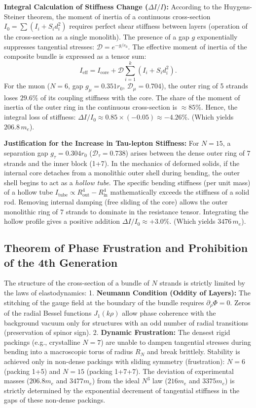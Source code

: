 \documentclass[11pt,a4paper]{article}
\begin{document}
\textbf{Integral Calculation of Stiffness Change ($\Delta I/I$):}
According to the Huygens-Steiner theorem, the moment of inertia of a continuous cross-section $I_0 = \sum (I_i + S_i d_i^2)$ requires perfect shear stiffness between layers (operation of the cross-section as a single monolith). The presence of a gap $g$ exponentially suppresses tangential stresses: $\mathcal{D} = e^{-g/r_0}$. The effective moment of inertia of the composite bundle is expressed as a tensor sum:
\begin{equation}
I_{\text{eff}} = I_{\text{core}} + \mathcal{D} \sum_{i=1}^{k} \left( I_i + S_i d_i^2 \right).
\end{equation}
For the muon ($N=6$, gap $g_\mu = 0.351 r_0$, $\mathcal{D}_\mu = 0.704$), the outer ring of 5 strands loses $29.6\%$ of its coupling stiffness with the core. The share of the moment of inertia of the outer ring in the continuous cross-section is $\approx 85\%$. Hence, the integral loss of stiffness: $\Delta I / I_0 \approx 0.85 \times (-0.05) \approx -4.26\%$. (Which yields $206.8 \, m_e$).

\textbf{Justification for the Increase in Tau-lepton Stiffness:}
For $N=15$, a separation gap $g_\tau = 0.304 r_0$ ($\mathcal{D}_\tau = 0.738$) arises between the dense outer ring of 7 strands and the inner block (1+7). In the mechanics of deformed solids, if the internal core detaches from a monolithic outer shell during bending, the outer shell begins to act as a \textit{hollow tube}. The specific bending stiffness (per unit mass) of a hollow tube $I_{\text{tube}} \propto R_{\text{out}}^4 - R_{\text{in}}^4$ mathematically exceeds the stiffness of a solid rod. Removing internal damping (free sliding of the core) allows the outer monolithic ring of 7 strands to dominate in the resistance tensor. Integrating the hollow profile gives a positive addition $\Delta I / I_0 \approx +3.0\%$. (Which yields $3476 \, m_e$).

\subsection{Theorem of Phase Frustration and Prohibition of the 4th Generation}
The structure of the cross-section of a bundle of $N$ strands is strictly limited by the laws of elastodynamics:
1. \textbf{Neumann Condition (Oddity of Layers):} The stitching of the gauge field at the boundary of the bundle requires $\partial_\rho \Phi = 0$. Zeros of the radial Bessel functions $J_1(k\rho)$ allow phase coherence with the background vacuum only for structures with an odd number of radial transitions (preservation of spinor sign).
2. \textbf{Dynamic Frustration:} The densest rigid packings (e.g., crystalline $N=7$) are unable to dampen tangential stresses during bending into a macroscopic torus of radius $R_N$ and break brittlely. Stability is achieved only in non-dense packings with sliding symmetry (frustration): $N=6$ (packing 1+5) and $N=15$ (packing 1+7+7).
The deviation of experimental masses ($206.8 m_e$ and $3477 m_e$) from the ideal $N^3$ law ($216 m_e$ and $3375 m_e$) is strictly determined by the exponential decrement of tangential stiffness in the gaps of these non-dense packings.
\end{document}
